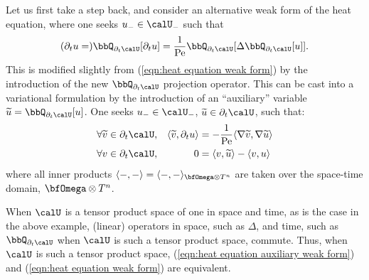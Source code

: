     Let us first take a step back, and consider an alternative weak form of the heat equation, where one seeks $u_{-}  \in  \calU_{-}$ such that
    \begin{equation}\label{eqn:heat equation auxiliary weak form}
        (\partial_{t}u  =)  \bbQ_{\partial_{t}\calU}[\partial_{t}u]  =  \frac{1}{\rmPe}\bbQ_{\partial_{t}\calU}[\Delta\bbQ_{\partial_{t}\calU}[u]].
    \end{equation}
    This is modified slightly from (\ref{eqn:heat equation weak form}) by the introduction of the new $\bbQ_{\partial_{t}\calU}$ projection operator. This can be cast into a variational formulation by the introduction of an ``auxiliary'' variable $\widetilde{u}  =  \bbQ_{\partial_{t}\calU}[u]$. One seeks $u_{-}  \in  \calU_{-}$, $\widetilde{u}  \in  \partial_{t}\calU$, such that:
    \begin{align}
        &\forall  \widetilde{v}  \in  \partial_{t}\calU,  &  \langle\widetilde{v}, \partial_{t}u\rangle  &=  - \frac{1}{\rmPe}\langle\nabla\widetilde{v}, \nabla\widetilde{u}\rangle  \label{eqn:heat equation auxiliary variational form 1}  \\
        &\forall              v  \in  \partial_{t}\calU,  &                                0  &=  \langle v, \widetilde{u}\rangle - \langle v, u\rangle  \label{eqn:heat equation auxiliary variational form 2}
    \end{align}
    where all inner products $\langle -, -\rangle  =  \langle -, -\rangle_{\bfOmega\otimes T^{n}}$ are taken over the space-time domain, $\bfOmega\otimes T^{n}$.
    
    When $\calU$ is a tensor product space of one in space and time, as is the case in the above example, (linear) operators in space, such as $\Delta$, and time, such as $\bbQ_{\partial_{t}\calU}$ when $\calU$ is such a tensor product space, commute. Thus, when $\calU$ is such a tensor product space, (\ref{eqn:heat equation auxiliary weak form}) and (\ref{eqn:heat equation weak form}) are equivalent.

